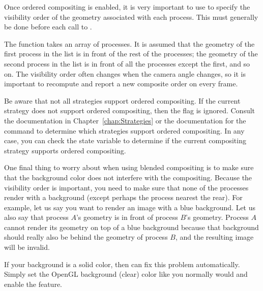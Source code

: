Once ordered compositing is enabled, it is very important to use
 to specify the visibility order of the geometry
associated with each process.  This must generally be done before each call
to .
\begin{Table}{1}
  \textC{(} 
   \textC{);}
\end{Table}
The  function takes an array of processes.  It is
assumed that the geometry of the first process in the list is in front of
the rest of the processes; the geometry of the second process in the list
is in front of all the processes except the first, and so on.  The
visibility order often changes when the camera angle changes, so it is
important to recompute and report a new composite order on every frame.

Be aware that not all strategies support ordered compositing.  If the
current strategy does not support ordered compositing, then the
 flag is ignored.  Consult the
documentation in Chapter~\ref{chap:Strategies} or the documentation for the
 command to determine which strategies support ordered
compositing.  In any case, you can check the
 state variable to determine if
the current compositing strategy supports ordered compositing.



One final thing to worry about when using blended compositing is to make
sure that the background color does not interfere with the compositing.
Because the visibility order is important, you need to make sure that none
of the processes render with a background (except perhaps the process
nearest the rear).  For example, let us say you want to render an image
with a blue background.  Let us also say that process $A$'s geometry is in
front of process $B$'s geometry.  Process $A$ cannot render its geometry on
top of a blue background because that background should really also be
behind the geometry of process $B$, and the resulting image will be
invalid.

If your background is a solid color, then \IceT can fix this problem
automatically.  Simply set the OpenGL background (clear) color like you
normally would and enable the 
feature.


